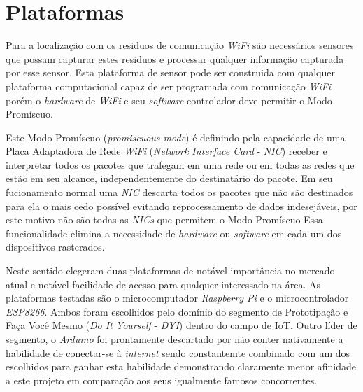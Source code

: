 \chapter{Plataformas}
\label{chap:Plataformas}

Para a localização com os residuos de comunicação \emph{WiFi} são necessários
sensores que possam capturar estes residuos e processar qualquer informação
capturada por esse sensor. Esta plataforma de sensor pode ser construida com
qualquer plataforma computacional capaz de ser programada com comunicação
\emph{WiFi} porém o \emph{hardware} de \emph{WiFi} e seu \emph{software}
controlador deve permitir o Modo Promíscuo.

Este Modo Promíscuo (\emph{promiscuous mode}) é definindo pela capacidade de uma
Placa Adaptadora de Rede \emph{WiFi} (\emph{Network Interface Card} -
\emph{NIC}) receber e interpretar todos os pacotes que trafegam em uma rede ou
em todas as redes que estão em seu alcance, independentemente do destinatário do
pacote. Em seu fucionamento normal uma \emph{NIC} descarta todos os pacotes que
não são destinados para ela o mais cedo possível evitando reprocessamento de
dados indesejáveis, por este motivo não são todas as \emph{NICs} que permitem o
Modo Promíscuo Essa funcionalidade elimina a necessidade de \emph{hardware} ou
\emph{software} em cada um dos dispositivos rasterados.

Neste sentido elegeram duas plataformas de notável importância no mercado atual
e notável facilidade de acesso para qualquer interessado na área. As plataformas
testadas são o microcomputador \emph{Raspberry Pi} e o microcontrolador
\emph{ESP8266}. Ambos  foram escolhidos pelo domínio do segmento de Prototipação
e Faça Você Mesmo  (\emph{Do It Yourself} - \emph{DYI}) dentro do campo de IoT.
Outro líder de segmento, o \emph{Arduino}  foi prontamente descartado por não
conter nativamente a habilidade de conectar-se à \emph{internet} sendo
constantemte combinado com um dos escolhidos para ganhar esta habilidade
demonstrando claramente menor afinidade a este projeto em comparação aos seus
igualmente famosos concorrentes.
